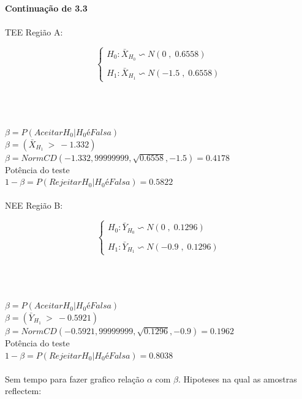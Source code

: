 \\
\textbf{Continuação de 3.3} \\
\\
TEE Região A:\\
\begin{minipage}[l]{0pt}
$$\left\lbrace\begin{array}{l}
H_0: \bar{X}_{H_0} \backsim N (0 \;,\; 0.6558) \\
\\
H_1: \bar{X}_{H_1} \backsim N (-1.5 \;,\; 0.6558)
\end{array}\right.$$
\end{minipage}\\
\\
\\
$\beta=P(Aceitar H_0 | H_0 é Falsa)$ \\
$\beta=(\bar{X}_{H_1} \:>\: -1.332)$	\\
$\beta=NormCD(-1.332,99999999,\sqrt{0.6558},-1.5)=0.4178$ \\
Potência do teste \\
$1-\beta=P(Rejeitar H_0 | H_0 é Falsa)=0.5822$\\
\\
NEE Região B:\\
\begin{minipage}[l]{0pt}
$$\left\lbrace\begin{array}{l}
H_0: \bar{Y}_{H_0} \backsim N (0 \;,\; 0.1296) \\
\\
H_1: \bar{Y}_{H_1} \backsim N (-0.9 \;,\; 0.1296)
\end{array}\right.$$
\end{minipage}\\
\\
\\
$\beta=P(Aceitar H_0 | H_0 é Falsa)$ \\
$\beta=(\bar{Y}_{H_1} \:>\: -0.5921)$	\\
$\beta=NormCD(-0.5921,99999999,\sqrt{0.1296},-0.9)=0.1962$ \\
Potência do teste \\
$1-\beta=P(Rejeitar H_0 | H_0 é Falsa)=0.8038$\\
\\
Sem tempo para fazer grafico relação $\alpha$ com $\beta$.
\newpage
Hipoteses na qual as amostras reflectem:\\
\\
